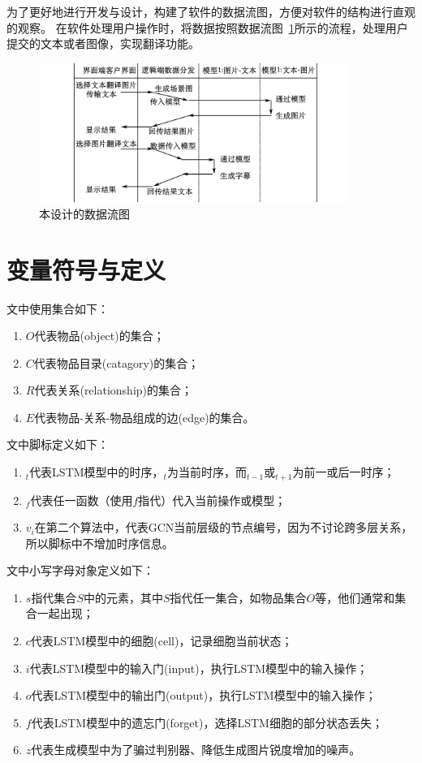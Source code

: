 为了更好地进行开发与设计，构建了软件的数据流图，方便对软件的结构进行直观的观察。
在软件处理用户操作时，将数据按照数据流图~\ref{fig:dataflow}所示的流程，处理用户提交的文本或者图像，实现翻译功能。

\begin{figure}
    \centering
    \includegraphics[width=0.9\textwidth]{figures/数据流图.png}
    \caption{本设计的数据流图}
    \label{fig:dataflow}
\end{figure}

\section{变量符号与定义}
文中使用集合如下：
\begin{enumerate}[fullwidth,itemindent=2em,label=\arabic*.]
    \item $O$代表物品(object)的集合；
    \item $C$代表物品目录(catagory)的集合；
    \item $R$代表关系(relationship)的集合；
    \item $E$代表物品-关系-物品组成的边(edge)的集合。
\end{enumerate}

文中脚标定义如下：
\begin{enumerate}[fullwidth,itemindent=2em,label=\arabic*.]
    \item ${}_t$代表LSTM模型中的时序，${}_t$为当前时序，而${}_{t-1}$或${}_{t+1}$为前一或后一时序；
    \item $_f$代表任一函数（使用$f$指代）代入当前操作或模型；
    \item $v_i$在第二个算法中，代表GCN当前层级的节点编号，因为不讨论跨多层关系，所以脚标中不增加时序信息。
\end{enumerate}

文中小写字母对象定义如下：
\begin{enumerate}[fullwidth,itemindent=2em,label=\arabic*.]
    \item $s$指代集合$S$中的元素，其中$S$指代任一集合，如物品集合$O$等，他们通常和集合一起出现；
    \item $c$代表LSTM模型中的细胞(cell)，记录细胞当前状态；
    \item $i$代表LSTM模型中的输入门(input)，执行LSTM模型中的输入操作；
    \item $o$代表LSTM模型中的输出门(output)，执行LSTM模型中的输入操作；
    \item $f$代表LSTM模型中的遗忘门(forget)，选择LSTM细胞的部分状态丢失；
    \item $z$代表生成模型中为了骗过判别器、降低生成图片锐度增加的噪声。
\end{enumerate}

